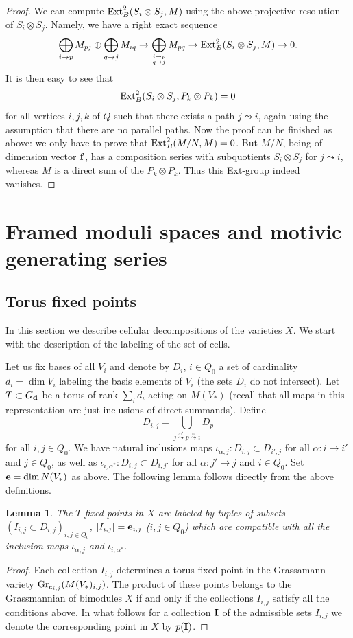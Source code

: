 \documentclass[12pt,a4paper]{amsart}
\numberwithin{equation}{section}
\newtheorem{lem}[thm]{Lemma}
\theoremstyle{remark}
\begin{document}
\begin{proof}
We can compute ${\rm Ext}^2_B(S_i\otimes S_j,M)$ using the above projective resolution of $S_i\otimes S_j$. Namely, we have a right exact sequence
$$\bigoplus_{i\rightarrow p}M_{pj}\oplus\bigoplus_{q\rightarrow j}M_{iq}\rightarrow
\bigoplus_{{i\rightarrow p}\atop{q\rightarrow j}}M_{pq}\rightarrow{\rm Ext}^2_B(S_i\otimes S_j,M)\rightarrow 0.$$
It is then easy to see that
$${\rm Ext}^2_B(S_i\otimes S_j,P_k\otimes P_k)=0$$
for all vertices $i,j,k$ of $Q$ such that there exists a path $j\leadsto i$, again using the assumption 
that there are no parallel paths. Now the proof can be finished as above: we only have to prove that 
${\rm Ext}^2_B(M/N,M)=0$. But $M/N$, being of dimension vector ${\bf f}$, has a composition series 
with subquotients $S_i\otimes S_j$ for $j\leadsto i$, whereas $M$ is a direct sum of the 
$P_k\otimes P_k$. Thus this Ext-group indeed vanishes.
\end{proof}

\section{Framed moduli spaces and motivic generating series}\label{sec:framedmoduli}

\subsection{Torus fixed points}
In this section we describe cellular decompositions of the varieties $X$. We start with
the description of the labeling of the set of cells.

Let us fix bases of all $V_i$ and denote by $D_i$, $i\in Q_0$ a set of cardinality $d_i=\dim V_i$ 
labeling the basis elements of $V_i$ (the sets $D_i$ do not intersect).
Let $T\subset G_{\bf d}$ be a torus of rank $\sum_id_i$
acting on $M(V_*)$ (recall that all maps in this representation are just inclusions of direct
summands).  Define 
$$D_{i,j}=\bigcup_{j\stackrel{\omega'}{\leadsto}p\stackrel{\omega}{\leadsto}i}D_p$$
for all $i,j\in Q_0$. We have natural inclusions maps 
$\iota_{\alpha,j}:D_{i,j}\subset D_{i',j}$ for all $\alpha:i\rightarrow i'$ and $j\in Q_0$, 
as well as 
$\iota_{i,\alpha^*}:D_{i,j}\subset D_{i,j'}$ for all $\alpha:j'\rightarrow j$ and $i\in Q_0$. 
Set ${\bf e}={\bf\rm dim}\, N(V_*)$ as above. The following lemma follows directly from 
the above definitions. 

\begin{lem}
The  $T$-fixed points in $X$ are labeled by tuples of subsets 
$(I_{i,j}\subset D_{i,j})_{i,j\in Q_0}$, $|I_{i,j}|={\bf e}_{i,j}$ ($i,j\in Q_0$) 
which are compatible with all the inclusion maps $\iota_{\alpha,j}$ and $\iota_{i,\alpha^*}$.
\end{lem}
\begin{proof}
 Each collection $I_{i,j}$ determines a torus fixed point in the Grassamann variety 
 ${\rm Gr}_{e_{i,j}}(M(V_*)_{i,j})$. The product of these points belongs to the
 Grassmannian of bimodules $X$ if and only if the collections $I_{i,j}$ satisfy
 all the conditions above. In what follows for a collection ${\bf I}$ of the 
 admissible sets $I_{i,j}$ we denote the corresponding point in $X$ by $p({\bf I})$.
\end{proof}
\end{document}
